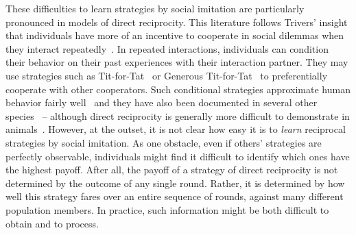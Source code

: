 \documentclass[11pt]{article}
\theoremstyle{plainCl1}
\theoremstyle{plainCl2}
\begin{document}
These difficulties to learn strategies by social imitation are particularly pronounced in models of direct reciprocity. 
This literature follows Trivers' insight that individuals have more of an incentive to cooperate in social dilemmas when they interact repeatedly~\citep{trivers1971evolution}. 
In repeated interactions, individuals can condition their behavior on their past experiences with their interaction partner. 
They may use strategies such as Tit-for-Tat~\citep{rapoport:book:1965,axelrod1981evolution} or Generous Tit-for-Tat~\citep{molander:jcr:1985,Nowak1992tit} to preferentially cooperate with other cooperators. 
Such conditional strategies approximate human behavior fairly well~\citep{fischbacher:EconL:2001,Rand:TCS:2013,DalBo:AER:2019,Montero-Porras:SciRep:2022,Rossetti:ETH:2023} and they have also been documented in several other species~\citep{Carter:PRSB:2013,Schweinfurth:AnBehav:2019,Voelkl:PNAS:2015} -- although direct reciprocity is generally more difficult to demonstrate in animals~\citep{CluttonBrock:Nature:2009,Silk:CurrentBiology:2013,taborsky:CurrentBiology:2013}.
However, at the outset, it is not clear how easy it is to {\it learn} reciprocal strategies by social imitation. 
As one obstacle, even if others' strategies are perfectly observable, individuals might find it difficult to identify which ones have the highest payoff. 
After all, the payoff of a strategy of direct reciprocity is not determined by the outcome of any single round.
Rather, it is determined by how well this strategy fares over an entire sequence of rounds, against many different population members. 
In practice, such information might be both difficult to obtain and to process. 

\end{document}
